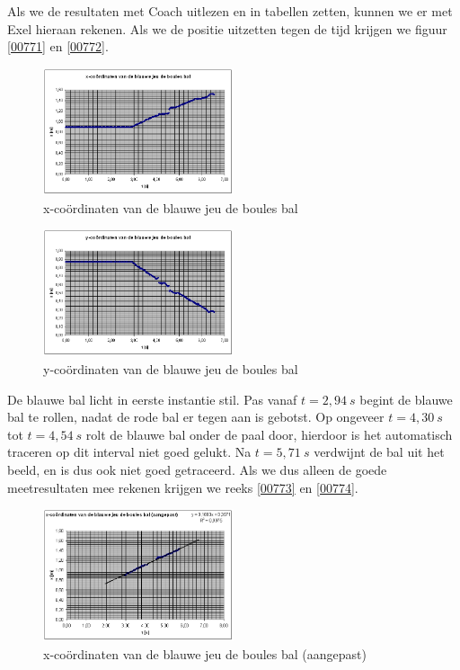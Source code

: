 \documentclass[12pt,a4paper]{article}
\begin{document}
	Als we de resultaten met Coach uitlezen en in tabellen zetten, kunnen we er met Exel hieraan rekenen. Als we de positie uitzetten tegen de tijd krijgen we figuur \eqref{00771} en \eqref{00772}.

	\begin{figure}[H]
		\centerline{\includegraphics[width=0.5\textwidth]{Plaatjes/00771.png}}
		\caption{x-co\"{o}rdinaten van de blauwe jeu de boules bal}
		\label{00771}
	\end{figure}
	
	\begin{figure}[H]
		\centerline{\includegraphics[width=0.5\textwidth]{Plaatjes/00772.png}}
		\caption{y-co\"{o}rdinaten van de blauwe jeu de boules bal}
		\label{00772}
	\end{figure}

	De blauwe bal licht in eerste instantie stil. Pas vanaf $t=2,94\ s$ begint de blauwe bal te rollen, nadat de rode bal er tegen aan is gebotst. Op ongeveer $t=4,30\ s$ tot $t=4,54\ s$ rolt de blauwe bal onder de paal door, hierdoor is het automatisch traceren op dit interval niet goed gelukt. Na $t=5,71\ s$ verdwijnt de bal uit het beeld, en is dus ook niet goed getraceerd. Als we dus alleen de goede meetresultaten mee rekenen krijgen we reeks \eqref{00773} en \eqref{00774}.

	\begin{figure}[H]
		\centerline{\includegraphics[width=0.5\textwidth]{Plaatjes/00773.png}}
		\caption{x-co\"{o}rdinaten van de blauwe jeu de boules bal (aangepast)}
		\label{00773}
	\end{figure}
	
\end{document}
